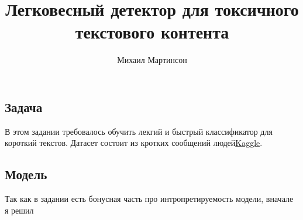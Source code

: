 \documentclass[11pt,a4paper]{article}
\title{Легковесный детектор для токсичного текстового контента}
\author{Михаил Мартинсон}
\theoremstyle{remark}
\begin{document}
	\maketitle
	
	\label{firstpage}
	
	\subsection*{Задача}
	
	В этом задании требовалось обучить лекгий и быстрый классификатор для короткий текстов. Датасет состоит из кротких сообщений людей\href{https://www.kaggle.com/c/jigsaw-toxic-comment-classification-challenge/overview}{Kaggle}.
	
	\subsection*{Модель}
	
	Так как в задании есть бонусная часть про интропретируемость модели, вначале я решил 
	
%	
%		
%		
%		
%		
%		
%		
			
		
\end{document}
